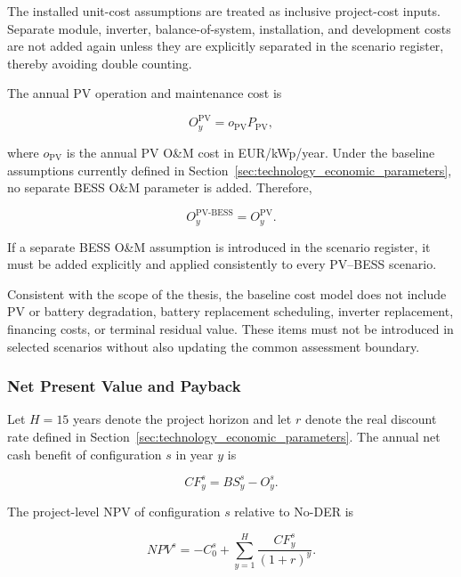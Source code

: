 The installed unit-cost assumptions are treated as inclusive project-cost inputs. Separate module, inverter, balance-of-system, installation, and development costs are not added again unless they are explicitly separated in the scenario register, thereby avoiding double counting.

The annual PV operation and maintenance cost is

\begin{equation}
O_y^{\mathrm{PV}}=o_{\mathrm{PV}}P_{\mathrm{PV}},
\label{eq:ch5_pv_opex}
\end{equation}

where $o_{\mathrm{PV}}$ is the annual PV O\&M cost in EUR/kWp/year. Under the baseline assumptions currently defined in Section~\ref{sec:technology_economic_parameters}, no separate BESS O\&M parameter is added. Therefore,

\begin{equation}
O_y^{\mathrm{PV\mbox{-}BESS}}=O_y^{\mathrm{PV}}.
\label{eq:ch5_pv_bess_opex}
\end{equation}

If a separate BESS O\&M assumption is introduced in the scenario register, it must be added explicitly and applied consistently to every PV--BESS scenario.

Consistent with the scope of the thesis, the baseline cost model does not include PV or battery degradation, battery replacement scheduling, inverter replacement, financing costs, or terminal residual value. These items must not be introduced in selected scenarios without also updating the common assessment boundary.

\subsubsection{Net Present Value and Payback}
\label{sec:ch5_npv_payback}

Let $H=15$ years denote the project horizon and let $r$ denote the real discount rate defined in Section~\ref{sec:technology_economic_parameters}. The annual net cash benefit of configuration $s$ in year $y$ is

\begin{equation}
CF_y^{s}=BS_y^{s}-O_y^{s}.
\label{eq:ch5_scenario_cash_flow}
\end{equation}

The project-level NPV of configuration $s$ relative to No-DER is

\begin{equation}
NPV^{s}=-C_0^{s}+\sum_{y=1}^{H}\frac{CF_y^{s}}{(1+r)^y}.
\label{eq:ch5_project_npv}
\end{equation}


